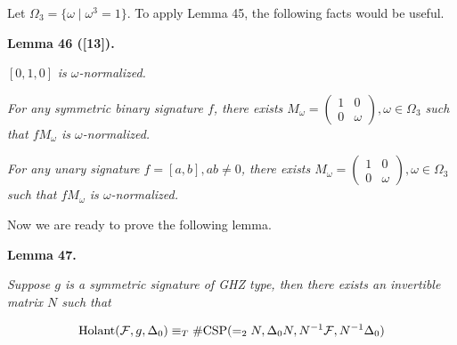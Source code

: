 Let $\Omega_{3}=\{\omega\mid\omega^{3}=1\}$. To apply Lemma 45, the following facts would be useful.\par





\par\medskip\noindent\textbf{
\textbf{Lemma 46}\textbf{ }([13])\textbf{.}
}\par



$[0,1,0]$\emph{ is $\omega$-normalized.}\par




\emph{For any symmetric binary signature $f$, there exists $M_{\omega}=\begin{pmatrix}1&0\\
0&\omega\end{pmatrix},\omega\in\Omega_{3}$ such that $fM_{\omega}$ is $\omega$-normalized.}\par




\emph{For any unary signature $f=[a,b],ab\neq 0$, there exists $M_{\omega}=\begin{pmatrix}1&0\\
0&\omega\end{pmatrix},\omega\in\Omega_{3}$ such that $fM_{\omega}$ is $\omega$-normalized.}\par






Now we are ready to prove the following lemma.\par





\par\medskip\noindent\textbf{
\textbf{Lemma 47}\textbf{.}
}\par



\emph{Suppose $g$ is a symmetric signature of GHZ type, then there exists an invertible matrix $N$ such that}\par


\[\begin{gathered}
\textup{{Holant}}(\mathcal{F},g,\Delta_{0})\equiv_{T}\textup{{\#CSP}}(=_{2}N,\Delta_{0}N,N^{-1}\mathcal{F},N^{-1}\Delta_{0})
\end{gathered}\]



